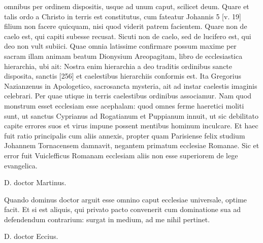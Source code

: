 omnibus per ordinem dispositis, usque ad unum caput, scilicet deum. Quare et talis ordo a Christo in terris est constitutus, cum fateatur Johannis 5 [v. 19] filium non facere quicquam, nisi quod viderit patrem facientem. Quare non de caelo est, qui capiti subesse recusat. Sicuti non de caelo, sed de lucifero est, qui deo non vult subiici. Quae omnia latissime confirmare possum maxime per sacram illam animam beatum Dionysium Areopagitam, libro de ecclesiastica hierarchia, ubi ait: Nostra enim hierarchia a deo traditis ordinibus sancte disposita, sanctis [256] et caelestibus hierarchiis conformis est. Ita Gregorius Nazianzenus in Apologetico, sacrosancta mysteria, ait ad instar caelestis imaginis celebrari. Per quae utique in terris caelestibus ordinibus associamur. Nam quod monstrum esset ecclesiam esse acephalam: quod omnes ferme haeretici moliti sunt, ut sanctus Cyprianus ad Rogatianum et Puppianum innuit, ut sic debilitato capite errores suos et virus impune possent mentibus hominum inculcare. Et haec fuit ratio principalis cum aliis annexis, propter quam Parisiense felix studium Johannem Tornacensem damnavit, negantem primatum ecclesiae Romanae. Sic et error fuit Vuiclefficus Romanam ecclesiam aliis non esse superiorem de lege evangelica.

D. doctor Martinus.

Quando dominus doctor arguit esse omnino caput ecclesiae universale, optime facit. Et si est aliquis, qui privato pacto convenerit cum dominatione sua ad defendendum contrarium: surgat in medium, ad me nihil pertinet.

D. doctor Eccius.

